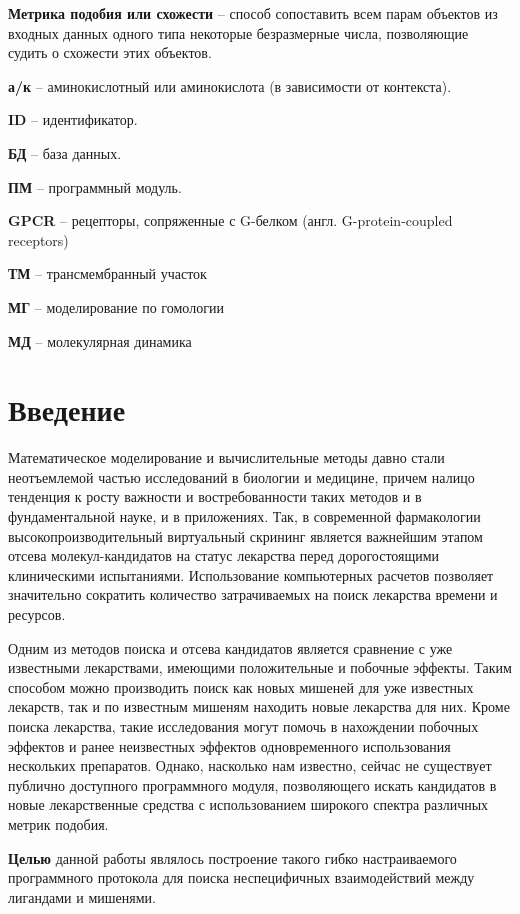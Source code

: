 \documentclass[a4paper,14pt]{article}         %
\begin{document}
\textbf{Метрика подобия или схожести} -- способ сопоставить всем парам объектов из входных данных одного типа некоторые безразмерные числа, позволяющие судить о схожести этих объектов.

\textbf{а/к} -- аминокислотный или аминокислота (в зависимости от контекста).

\textbf{ID} -- идентификатор.

\textbf{БД} -- база данных.

\textbf{ПМ} -- программный модуль.

\color{gray}
\textbf{GPCR} -- рецепторы, сопряженные с G-белком (англ. G-protein-coupled receptors)

\textbf{ТМ} -- трансмембранный участок

\textbf{МГ} -- моделирование по гомологии

\textbf{МД} -- молекулярная динамика
\color{black}

\newpage
\section{Введение}
Математическое моделирование и вычислительные методы давно стали неотъемлемой частью исследований в биологии и медицине, причем налицо тенденция к росту важности и востребованности таких методов и в фундаментальной науке, и в приложениях. Так, в современной фармакологии высокопроизводительный виртуальный скрининг является важнейшим этапом отсева молекул-кандидатов на статус лекарства перед дорогостоящими клиническими испытаниями. Использование компьютерных расчетов позволяет значительно сократить количество затрачиваемых на поиск лекарства времени и ресурсов.

Одним из методов поиска и отсева кандидатов является сравнение с уже известными лекарствами, имеющими положительные и побочные эффекты. Таким способом можно производить поиск как новых мишеней для уже известных лекарств, так и по известным мишеням находить новые лекарства для них. Кроме поиска лекарства, такие исследования могут помочь в нахождении побочных эффектов и ранее неизвестных эффектов одновременного использования нескольких препаратов. Однако, насколько нам известно, сейчас не существует публично доступного программного модуля, позволяющего искать кандидатов в новые лекарственные средства с использованием широкого спектра различных метрик подобия.

\textbf{Целью} данной работы являлось построение такого гибко настраиваемого программного протокола для поиска неспецифичных взаимодействий между лигандами и мишенями. 
\end{document}

